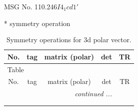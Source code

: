\documentclass[fleqn,8pt]{jsarticle}
\begin{document}
\setcounter{MaxMatrixCols}{32}

\renewcommand{\tablename}{Table~}
\renewcommand{\figurename}{Figure~}
\begin{center}
\LARGE
MSG No. 110.246\quad$I4_{1}cd1'$
\end{center}
* symmetry operation
\renewcommand{\arraystretch}{1.3}
\begin{longtable}{ccccc}
\caption{Symmetry operations for 3d polar vector.}
 \\
 \hline \hline
No. & tag & matrix (polar) & det & TR \\ \hline \endfirsthead

\multicolumn{4}{l}{\tablename\ \thetable{}} \\
 \hline \hline
No. & tag & matrix (polar) & det & TR \\ \hline \endhead

 \hline \hline
\multicolumn{4}{r}{\footnotesize\it continued ...} \\ \endfoot

 \hline \hline
\multicolumn{4}{r}{} \\ \endlastfoot


\end{longtable}
\end{document}
